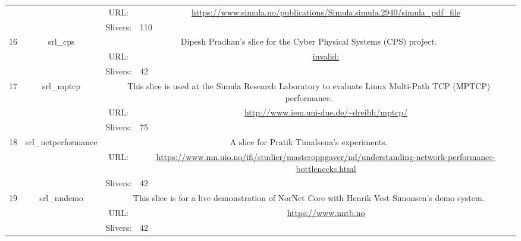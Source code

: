 \begin{small}
\begin{center}
\begin{longtable}{|c|c|c|c|}
  &  & \multicolumn{1}{|p{5em}|}{URL:} & \multicolumn{1}{|p{22.5em}|}{\url{https://www.simula.no/publications/Simula.simula.2940/simula_pdf_file}} \\* \cline{3-3}\cline{4-4}
  &  & \multicolumn{1}{|l|}{Slivers:} & \multicolumn{1}{|l|}{110} \\ \hline
 \multirow{3}{*}{16} & \multirow{3}{*}{\index{srl\_cps}\index{Slice!srl\_cps}srl\_cps} & \multicolumn{2}{|p{30em}|}{Dipesh Pradhan's slice for the Cyber Physical Systems (CPS) project.} \\* \cline{3-3}\cline{4-4}
  &  & \multicolumn{1}{|p{5em}|}{URL:} & \multicolumn{1}{|p{22.5em}|}{\url{invalid:}} \\* \cline{3-3}\cline{4-4}
  &  & \multicolumn{1}{|l|}{Slivers:} & \multicolumn{1}{|l|}{42} \\ \hline
 \multirow{3}{*}{17} & \multirow{3}{*}{\index{srl\_mptcp}\index{Slice!srl\_mptcp}srl\_mptcp} & \multicolumn{2}{|p{30em}|}{This slice is used at the Simula Research Laboratory to evaluate Linux Multi-Path TCP (MPTCP) performance.} \\* \cline{3-3}\cline{4-4}
  &  & \multicolumn{1}{|p{5em}|}{URL:} & \multicolumn{1}{|p{22.5em}|}{\url{http://www.iem.uni-due.de/~dreibh/mptcp/}} \\* \cline{3-3}\cline{4-4}
  &  & \multicolumn{1}{|l|}{Slivers:} & \multicolumn{1}{|l|}{75} \\ \hline
 \multirow{3}{*}{18} & \multirow{3}{*}{\index{srl\_netperformance}\index{Slice!srl\_netperformance}srl\_netperformance} & \multicolumn{2}{|p{30em}|}{A slice for Pratik Timalsena's experiments.} \\* \cline{3-3}\cline{4-4}
  &  & \multicolumn{1}{|p{5em}|}{URL:} & \multicolumn{1}{|p{22.5em}|}{\url{https://www.mn.uio.no/ifi/studier/masteroppgaver/nd/understanding-network-performance-bottlenecks.html}} \\* \cline{3-3}\cline{4-4}
  &  & \multicolumn{1}{|l|}{Slivers:} & \multicolumn{1}{|l|}{42} \\ \hline
 \multirow{3}{*}{19} & \multirow{3}{*}{\index{srl\_nndemo}\index{Slice!srl\_nndemo}srl\_nndemo} & \multicolumn{2}{|p{30em}|}{This slice is for a live demonstration of NorNet Core with Henrik Vest Simonsen's demo system.} \\* \cline{3-3}\cline{4-4}
  &  & \multicolumn{1}{|p{5em}|}{URL:} & \multicolumn{1}{|p{22.5em}|}{\url{https://www.nntb.no}} \\* \cline{3-3}\cline{4-4}
  &  & \multicolumn{1}{|l|}{Slivers:} & \multicolumn{1}{|l|}{42} \\ \hline

\end{longtable}
\end{center}
\end{small}

